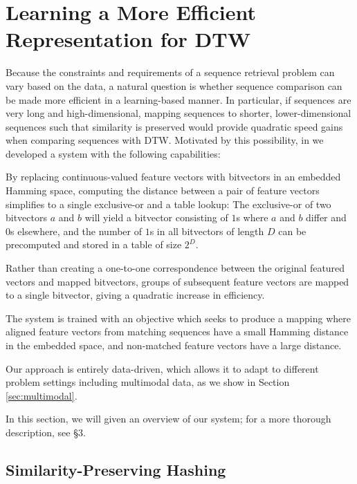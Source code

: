 \documentclass{article} %
\begin{document}
\section{Learning a More Efficient Representation for DTW}

Because the constraints and requirements of a sequence retrieval problem can vary based on the data, a natural question is whether sequence comparison can be made more efficient in a learning-based manner.
In particular, if sequences are very long and high-dimensional, mapping sequences to shorter, lower-dimensional sequences such that similarity is preserved would provide quadratic speed gains when comparing sequences with DTW.
Motivated by this possibility, in \cite{raffel2015large} we developed a system with the following capabilities:
\begin{description}[topsep=1pt,itemsep=-1pt,leftmargin=10pt]
\item[Maps to a Hamming space:] By replacing continuous-valued feature vectors with bitvectors in an embedded Hamming space, computing the distance between a pair of feature vectors simplifies to a single exclusive-or and a table lookup: The exclusive-or of two bitvectors $a$ and $b$ will yield a bitvector consisting of $1$s where $a$ and $b$ differ and $0$s elsewhere, and the number of $1$s in all bitvectors of length $D$ can be precomputed and stored in a table of size $2^D$.
\item[Downsamples sequences:] Rather than creating a one-to-one correspondence between the original featured vectors and mapped bitvectors, groups of subsequent feature vectors are mapped to a single bitvector, giving a quadratic increase in efficiency.
\item[Preserves similarity:] The system is trained with an objective which seeks to produce a mapping where aligned feature vectors from matching sequences have a small Hamming distance in the embedded space, and non-matched feature vectors have a large distance.
\item[Learns its representation:] Our approach is entirely data-driven, which allows it to adapt to different problem settings including multimodal data, as we show in Section \ref{sec:multimodal}.
\end{description}

In this section, we will given an overview of our system; for a more thorough description, see \cite{raffel2015large} \S3.

\subsection{Similarity-Preserving Hashing}
\end{document}
